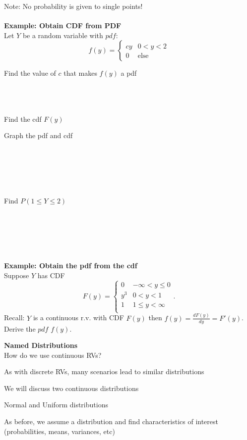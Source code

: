 Note: No probability is given to single points!\\~\\

\textbf{Example:  Obtain CDF from PDF}\\
Let $Y$ be a random variable with $pdf$:
\[ f(y) = \begin{cases} cy & 0<y<2 \\ 0 &\text{else}\end{cases}
\]
\be
\item Find the value of $c$ that makes $f(y)$ a pdf\\~\\~\\~\\
\item Find the cdf $F(y)$
\pagebreak
\item Graph the pdf and cdf\\~\\~\\~\\~\\~\\
\item Find $P(1\leq Y\leq 2)$\\~\\~\\~\\~\\~\\
\ee

\textbf{Example: Obtain the pdf from the cdf}\\
Suppose $Y$ has CDF
$$F(y) = \left\{\begin{array}{lc}
           0 & -\infty<y\leq0 \\
           y^3 & 0< y < 1\\
           1 & 1 \leq y < \infty\\
         \end{array}\right..$$
Recall: $Y$ is a continuous r.v. with CDF $F(y)$ then $f(y) = \frac{dF(y)}{dy} = F'(y)$.  Derive the $pdf$ $f(y)$.

\pagebreak

\textbf{Named Distributions}\\
How do we use continuous RVs?
\bi
\item As with discrete RVs, many scenarios lead to similar distributions
\item We will discuss two continuous distributions
\bi
\item Normal and Uniform distributions
\ei
\item As before, we assume a distribution and find characteristics of interest (probabilities, means, variances, etc)
\ei

